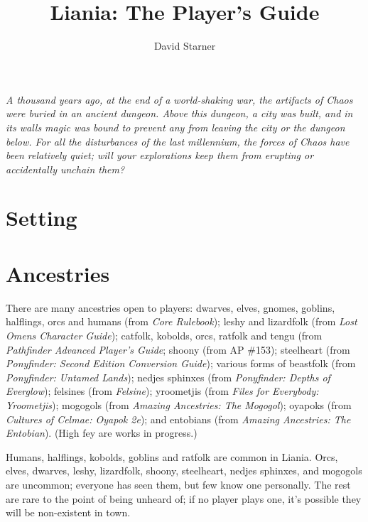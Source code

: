 \documentclass{report}
\title{Liania: The Player's Guide}
\author{David Starner}
\begin{document}
\maketitle
\emph{A thousand years ago, at the end of a world-shaking war, the artifacts of
Chaos were buried in an ancient dungeon. Above this dungeon, a city was built,
and in its walls magic was bound to prevent any from leaving the city or the
dungeon below. For all the disturbances of the last millennium, the forces
of Chaos have been relatively quiet; will your explorations keep them from
erupting or accidentally unchain them?}

\chapter{Setting}


\chapter{Ancestries}

There are many ancestries open to players: dwarves, elves, gnomes, goblins,
halflings, orcs and humans (from \emph{Core Rulebook}); leshy and lizard\-folk (from
\emph{Lost Omens Character Guide}); catfolk, kobolds, orcs, ratfolk and tengu (from
\emph{Pathfinder Advanced Player's Guide}; shoony (from AP \#153);
steel\-heart (from \emph{Pony\-finder: Second Edition Conversion Guide}); various forms
of beast\-folk (from \emph{Pony\-finder: Untamed Lands}); nedjes sphinxes (from \emph{Pony\-finder:
Depths of Everglow}); felsines (from \emph{Felsine}); yroo\-metjis (from
\emph{Files for Everybody: Yroometjis}); mogogols (from
\emph{Amazing Ancestries: The Mogogol}); oya\-poks (from
\emph{Cultures of Celmae: Oyapok 2e}); and ento\-bians (from
\emph{Amazing Ancestries: The Entobian}). (High fey are works in
progress.)

Humans, halflings, kobolds, goblins and rat\-folk are common in Liania. Orcs, elves,
dwarves, leshy, lizard\-folk, shoony, steel\-heart, nedjes sphinxes, and mog\-ogols are
uncommon; everyone has seen them, but few know one personally. The rest are
rare to the point of being unheard of; if no player plays one, it's possible
they will be non-existent in town.
\end{document}
